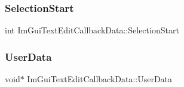 \subsubsection{\texorpdfstring{Selection\+Start}{SelectionStart}}
{\footnotesize\ttfamily int Im\+Gui\+Text\+Edit\+Callback\+Data\+::\+Selection\+Start}

\hypertarget{struct_im_gui_text_edit_callback_data_aaf4994a17aefa6ace9cf8f7c2fa06cf7}{}\label{struct_im_gui_text_edit_callback_data_aaf4994a17aefa6ace9cf8f7c2fa06cf7} 
\subsubsection{\texorpdfstring{User\+Data}{UserData}}
{\footnotesize\ttfamily void$\ast$ Im\+Gui\+Text\+Edit\+Callback\+Data\+::\+User\+Data}

